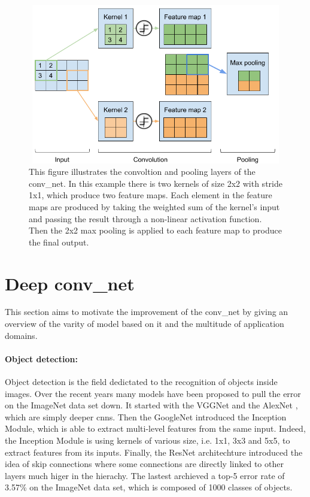\documentclass[11pt]{report}
\begin{document}
\begin{figure}[h]
\centering
\includegraphics[width=12cm, height=7cm]{conv_net}
\caption{This figure illustrates the convoltion and pooling layers of the \acrshort{conv_net}. In this example there is two kernels of size 2x2 with stride 1x1, which produce two feature maps. Each element in the feature maps are produced by taking the weighted sum of the kernel's input and passing the result through a non-linear activation function. Then the 2x2 max pooling is applied to each feature map to produce the final output.}
\label{fig:conv_net}
\end{figure}
\section{Deep \acrshort{conv_net}}

This section aims to motivate the improvement of the \acrshort{conv_net} by giving an overview of the varity of model based on it and the multitude of application domains.

\paragraph{Object detection:} Object detection is the field dedictated to the recognition of objects inside images. Over the recent years many models have been proposed to pull the error on the ImageNet data set \cite{imagenet_cvpr09} down. It started with the VGGNet \cite{DBLP:journals/corr/RussakovskyDSKSMHKKBBF14} and the AlexNet \cite{DBLP:journals/cacm/KrizhevskySH17}, which are simply deeper \acrshort{cnn}s. Then the GoogleNet \cite{DBLP:conf/cvpr/SzegedyLJSRAEVR15} introduced the Inception Module, which is able to extract multi-level features from the same input. Indeed, the Inception Module is using kernels of various size, i.e. 1x1, 3x3 and 5x5, to extract features from its inputs. Finally, the ResNet architechture \cite{DBLP:conf/cvpr/HeZRS16} introduced the idea of skip connections where some connections are directly linked to other layers much higer in the hierachy. The lastest archieved a top-5 error rate of 3.57\% on the ImageNet data set, which is composed of 1000 classes of objects.\newline
\end{document}
